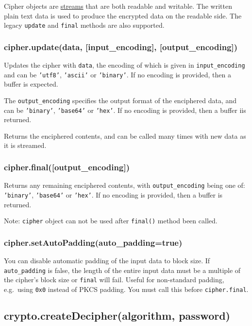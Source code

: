 Cipher objects are \href{stream.html}{streams} that are both readable
and writable. The written plain text data is used to produce the
encrypted data on the readable side. The legacy \texttt{update} and
\texttt{final} methods are also supported.

\subsubsection{cipher.update(data, {[}input\_encoding{]},
{[}output\_encoding{]})}

Updates the cipher with \texttt{data}, the encoding of which is given in
\texttt{input\_encoding} and can be \texttt{'utf8'}, \texttt{'ascii'} or
\texttt{'binary'}. If no encoding is provided, then a buffer is
expected.

The \texttt{output\_encoding} specifies the output format of the
enciphered data, and can be \texttt{'binary'}, \texttt{'base64'} or
\texttt{'hex'}. If no encoding is provided, then a buffer iis returned.

Returns the enciphered contents, and can be called many times with new
data as it is streamed.

\subsubsection{cipher.final({[}output\_encoding{]})}

Returns any remaining enciphered contents, with
\texttt{output\_encoding} being one of: \texttt{'binary'},
\texttt{'base64'} or \texttt{'hex'}. If no encoding is provided, then a
buffer is returned.

Note: \texttt{cipher} object can not be used after \texttt{final()}
method been called.

\subsubsection{cipher.setAutoPadding(auto\_padding=true)}

You can disable automatic padding of the input data to block size. If
\texttt{auto\_padding} is false, the length of the entire input data
must be a multiple of the cipher's block size or \texttt{final} will
fail. Useful for non-standard padding, e.g.~using \texttt{0x0} instead
of PKCS padding. You must call this before \texttt{cipher.final}.

\subsection{crypto.createDecipher(algorithm, password)}

